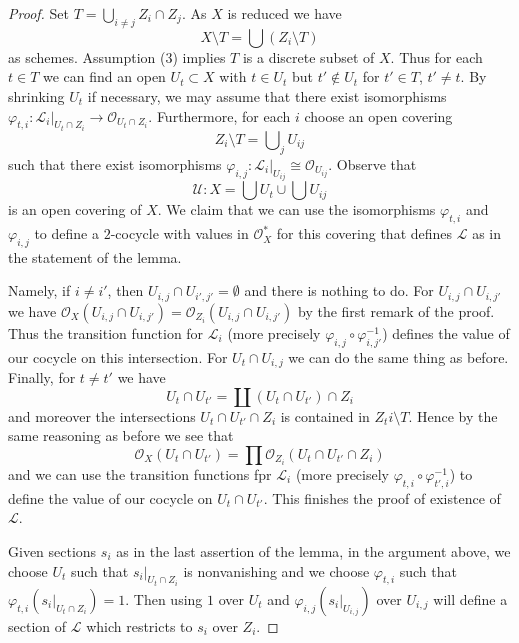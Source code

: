 \begin{proof}
Set $T = \bigcup_{i \not = j} Z_i \cap Z_j$. As $X$ is reduced we have
$$
X \setminus T = \bigcup (Z_i \setminus T)
$$
as schemes. Assumption (3) implies $T$ is a discrete subset of $X$.
Thus for each $t \in T$ we can find an open $U_t \subset X$
with $t \in U_t$ but $t' \not \in U_t$ for $t' \in T$, $t' \not = t$.
By shrinking $U_t$ if necessary, we may assume that there exist isomorphisms
$\varphi_{t, i} : \mathcal{L}_i|_{U_t \cap Z_i} \to
\mathcal{O}_{U_t \cap Z_i}$. Furthermore, for each $i$ choose an open covering
$$
Z_i \setminus T = \bigcup\nolimits_j U_{ij}
$$
such that there exist isomorphisms
$\varphi_{i, j} : \mathcal{L}_i|_{U_{ij}} \cong \mathcal{O}_{U_{ij}}$.
Observe that
$$
\mathcal{U} : X = \bigcup U_t \cup \bigcup U_{ij}
$$
is an open covering of $X$. We claim that we can use the isomorphisms
$\varphi_{t, i}$ and $\varphi_{i, j}$ to define a $2$-cocycle with values
in $\mathcal{O}_X^*$ for this covering that defines $\mathcal{L}$ as
in the statement of the lemma.

\medskip\noindent
Namely, if $i \not = i'$, then $U_{i, j} \cap U_{i', j'} = \emptyset$
and there is nothing to do. For $U_{i, j} \cap U_{i, j'}$ we have
$\mathcal{O}_X(U_{i, j} \cap U_{i, j'}) =
\mathcal{O}_{Z_i}(U_{i, j} \cap U_{i, j'})$ by the first remark of the proof.
Thus the transition function for $\mathcal{L}_i$ (more precisely
$\varphi_{i, j} \circ \varphi_{i, j'}^{-1}$) defines the value of our
cocycle on this intersection.
For $U_t \cap U_{i, j}$ we can do the same thing as before.
Finally, for $t \not = t'$ we have
$$
U_t \cap U_{t'} = \coprod (U_t \cap U_{t'}) \cap Z_i
$$
and moreover the intersections $U_t \cap U_{t'} \cap Z_i$ is contained
in $Z_ti \setminus T$. Hence by the same reasoning as before we see that
$$
\mathcal{O}_X(U_t \cap U_{t'}) =
\prod \mathcal{O}_{Z_i}(U_t \cap U_{t'} \cap Z_i)
$$
and we can use the transition functions fpr $\mathcal{L}_i$ (more precisely
$\varphi_{t, i} \circ \varphi_{t', i}^{-1}$) to define the value of
our cocycle on $U_t \cap U_{t'}$. This finishes the proof of existence
of $\mathcal{L}$.

\medskip\noindent
Given sections $s_i$ as in the last assertion of the lemma, in the argument
above, we choose $U_t$ such that $s_i|_{U_t \cap Z_i}$ is nonvanishing and
we choose $\varphi_{t, i}$ such that $\varphi_{t, i}(s_i|_{U_t \cap Z_i}) = 1$.
Then using $1$ over $U_t$ and $\varphi_{i, j}(s_i|_{U_{i, j}})$ over
$U_{i, j}$ will define a section of $\mathcal{L}$ which restricts
to $s_i$ over $Z_i$.
\end{proof}

